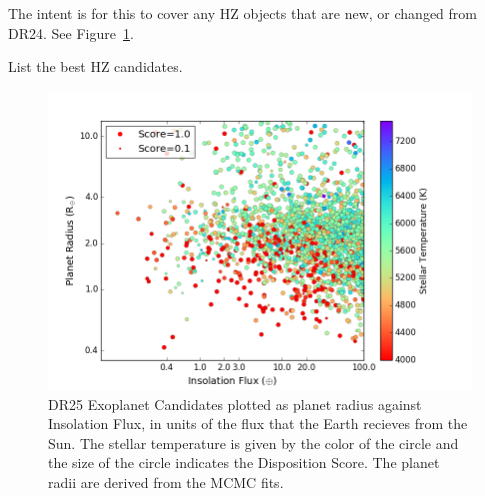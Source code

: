 \label{s:hz}
The intent is for this to cover any HZ objects that are new, or changed from DR24. See Figure~\ref{f:catalogPlot}.

List the best HZ candidates.

\begin{figure}
    \centering
    \includegraphics[width=1.1\linewidth]{fig-CatalogRadiusInsolScore.png}
    \caption{DR25 Exoplanet Candidates plotted as planet radius against Insolation Flux, in units of the flux that the Earth recieves from the Sun. The stellar temperature is given by the color of the circle and the size of the circle indicates the Disposition Score. The planet radii are derived from the MCMC fits. }
    \label{f:catalogPlot}
\end{figure}